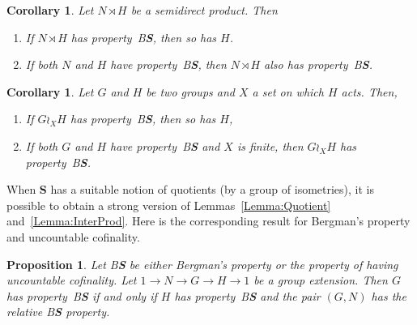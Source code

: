\documentclass[a4paper]{article}
\newtheorem{cor}[lem]{Corollary}
\newtheorem{prop}[lem]{Proposition}
\theoremstyle{definition}
\newcommand*{\category}[1]{\textbf{#1}}
\newcommand*{\CatS}{\category{S}}
\newcommand*{\BS}{B\textbf{S}}
\begin{document}
%
%
\begin{cor}\label{Cor:Semidirect}
Let $N\rtimes H$ be a %
semidirect product. Then
\begin{enumerate}
\item
If $N\rtimes H$ has property~\BS, then so has $H$.
\item
If both $N$ and $H$ have property~\BS, then $N\rtimes H$ also has property~\BS.
\end{enumerate}
\end{cor}
%
%
\begin{cor}\label{Cor:Wreath}
Let $G$ and $H$ be two groups and $X$ a set on which $H$ acts.%
Then,
\begin{enumerate}
\item
If $G\wr_X H$ has property~\BS, then so has $H$,
\item
If both $G$ and $H$ have property~\BS{} and $X$ is finite, then $G\wr_X H$ has property~\BS.
\end{enumerate}
\end{cor}
%
%
When \CatS{} has a suitable notion of quotients (by a group of isometries), it is possible to obtain a strong version of Lemmas~\ref{Lemma:Quotient} and~\ref{Lemma:InterProd}.
Here is the corresponding result for Bergman's property and uncountable cofinality.
%
%
\begin{prop}\label{Prop:Extension}
Let \BS{} be either Bergman's property or the property of having uncountable cofinality.
Let $1\to N\to G\to H\to 1$ be a group extension.
Then $G$ has property~\BS{} if and only if $H$ has property~\BS{} and the pair $(G,N)$ has the relative \BS{} property.
\end{prop}
\end{document}
